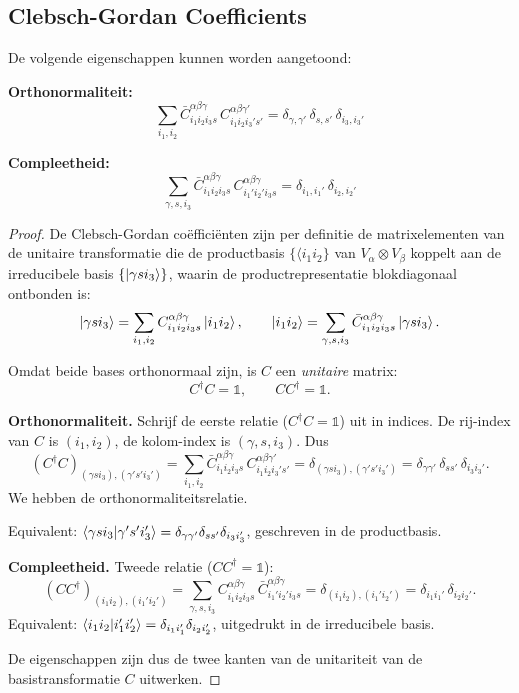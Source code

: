 
\subsection{Clebsch-Gordan Coefficients}

De volgende eigenschappen kunnen worden aangetoond:

\textbf{Orthonormaliteit:}
\[
\sum_{i_1, i_2} \bar{C}_{i_1 i_2 i_3 s}^{\alpha \beta \gamma} \, C_{i_1 i_2 i_3' s'}^{\alpha \beta \gamma'} = \delta_{\gamma, \gamma'} \, \delta_{s, s'} \, \delta_{i_3, i_3'}
\]

\textbf{Compleetheid:}
\[
\sum_{\gamma, s, i_3} \bar{C}_{i_1 i_2 i_3 s}^{\alpha \beta \gamma} \, C_{i_1' i_2' i_3 s}^{\alpha \beta \gamma} = \delta_{i_1, i_1'} \, \delta_{i_2, i_2'}
\]

\begin{proof}
De Clebsch-Gordan coëfficiënten zijn per definitie de matrixelementen van de unitaire transformatie die de productbasis $\{\langle{i_1 i_2}\}$ van $V_\alpha \otimes V_\beta$ koppelt aan de irreducibele basis $\{\ket{\gamma s i_3}\}$, waarin de productrepresentatie blokdiagonaal ontbonden is:
\[
\ket{\gamma s i_3} = \sum_{i_1,i_2} C^{\alpha\beta\gamma}_{i_1 i_2 i_3 s} \ket{i_1 i_2},
\qquad
\ket{i_1 i_2} = \sum_{\gamma,s,i_3} \bar{C}^{\alpha\beta\gamma}_{i_1 i_2 i_3 s} \ket{\gamma s i_3}.
\]

Omdat beide bases orthonormaal zijn, is $C$ een \emph{unitaire} matrix:
\[
C^\dagger C = \mathds{1}, \qquad C C^\dagger = \mathds{1}.
\]

\textbf{Orthonormaliteit.}
Schrijf de eerste relatie ($C^\dagger C = \mathds{1}$) uit in indices. De rij-index van $C$ is $(i_1,i_2)$, de kolom-index is $(\gamma,s,i_3)$. Dus
\[
(C^\dagger C)_{(\gamma s i_3),(\gamma' s' i_3')}
= \sum_{i_1,i_2} \bar{C}^{\alpha\beta\gamma}_{i_1 i_2 i_3 s} \, C^{\alpha\beta\gamma'}_{i_1 i_2 i_3' s'}
= \delta_{(\gamma s i_3),(\gamma' s' i_3')}
= \delta_{\gamma\gamma'}\,\delta_{ss'}\,\delta_{i_3 i_3'}.
\]
We hebben de orthonormaliteitsrelatie.

Equivalent: $\braket{\gamma s i_3 | \gamma' s' i_3'} = \delta_{\gamma\gamma'}\delta_{ss'}\delta_{i_3i_3'}$, geschreven in de productbasis.

\textbf{Compleetheid.}
Tweede relatie ($CC^\dagger = \mathds{1}$):
\[
(C C^\dagger)_{(i_1 i_2),(i_1' i_2')}
= \sum_{\gamma,s,i_3} C^{\alpha\beta\gamma}_{i_1 i_2 i_3 s} \, \bar{C}^{\alpha\beta\gamma}_{i_1' i_2' i_3 s}
= \delta_{(i_1 i_2),(i_1' i_2')}
= \delta_{i_1 i_1'}\,\delta_{i_2 i_2'}.
\]
Equivalent: $\braket{i_1 i_2 | i_1' i_2'} = \delta_{i_1i_1'}\delta_{i_2i_2'}$, uitgedrukt in de irreducibele basis.

De eigenschappen zijn dus de twee kanten van de unitariteit van de basistransformatie $C$ uitwerken.
\end{proof}



